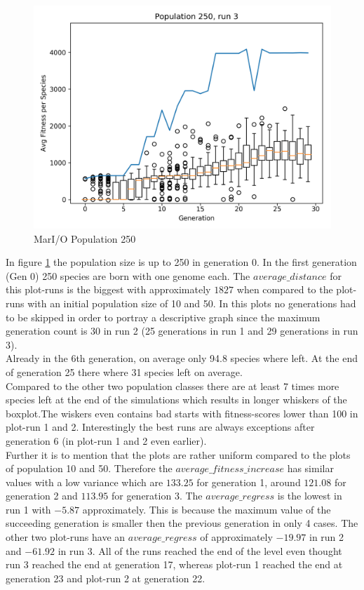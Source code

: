 \begin{figure}[h]
\begin{minipage}{0.33\textwidth}
					\includegraphics[width=1\textwidth]{graphics/mario/pop250_run3} %
				\end{minipage}
				\caption{MarI/O Population 250}
				\label{fig:mario250}
			\end{figure}
			In figure \ref{fig:mario250} the population size is up to 250 in generation 0. In the first generation (Gen 0) 250 species are born with one genome each. The $average\_distance$ for this plot-runs is the biggest with approximately $1827$ when compared to the plot-runs with an initial population size of 10 and 50. In this plots no generations had to be skipped in order to portray a descriptive graph since the maximum generation count is 30 in run 2 (25 generations in run 1 and 29 generations in run 3).\\
			Already in the 6th generation, on average only 94.8 species where left. At the end of generation 25 there where 31 species left on average. \\
			Compared to the other two population classes there are at least 7 times more species left at the end of the simulations which results in longer whiskers of the boxplot.The wiskers even contains bad starts with fitness-scores lower than 100 in plot-run 1 and 2. Interestingly the best runs are always exceptions after generation 6 (in plot-run 1 and 2 even earlier). \\
			Further it is to mention that the plots are rather uniform compared to the plots of population 10 and 50. Therefore the $average\_fitness\_increase$ has similar values with a low variance which are $133.25$ for generation 1, around $121.08$ for generation 2 and $113.95$ for generation 3. The $average\_regress$ is the lowest in run 1 with $-5.87$ approximately. This is because the maximum value of the succeeding generation is smaller then the previous generation in only 4 cases. The other two plot-runs have an $average\_regress$ of approximately $-19.97$ in run 2 and $-61.92$ in run 3. All of the runs reached the end of the level even thought run 3 reached the end at generation 17, whereas plot-run 1 reached the end at generation 23 and plot-run 2 at generation 22.	
	
